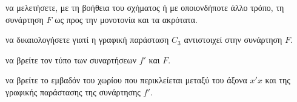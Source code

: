 \begin{alist}
    \item να μελετήσετε, με τη βοήθεια του σχήματος ή με οποιονδήποτε άλλο τρόπο, τη συνάρτηση $F$ ως προς την μονοτονία και τα ακρότατα. 
    \item να δικαιολογήσετε γιατί η γραφική παράσταση $C_3$ αντιστοιχεί στην συνάρτηση $F$. 
    \item να βρείτε τον τύπο των συναρτήσεων $f'$ και $F$. 
    \item να βρείτε το εμβαδόν του χωρίου που περικλείεται μεταξύ του άξονα $x'x$ και της γραφικής παράστασης της συνάρτησης $f'$. 
\end{alist}